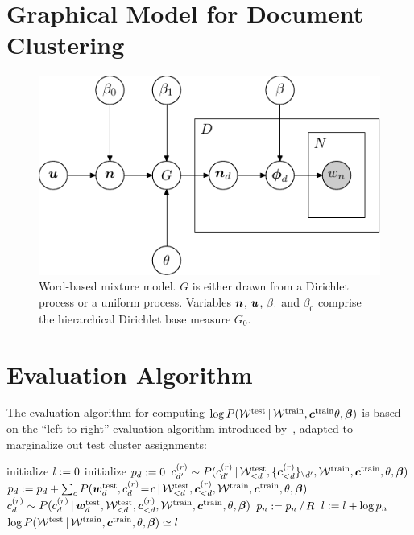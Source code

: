 \documentclass{article}
\begin{document}
\section{Graphical Model for Document Clustering}

\begin{figure}[ht!]
\begin{center}
\includegraphics[scale=0.75]{figures/dpmm_fixed-1.pdf}
\end{center}
\caption{Word-based mixture model. $G$ is either drawn from a
  Dirichlet process or a uniform process. Variables $\boldsymbol{n}$, $\boldsymbol{u}$, $\beta_1$
  and $\beta_0$ comprise the hierarchical Dirichlet base
  measure $G_0$.}
\label{fig:dpmm}
\end{figure}

\section{Evaluation Algorithm} \label{leftright}

The evaluation algorithm for computing
$\log{P(\mathcal{W}^{\textrm{test}} \,|\,\mathcal{W}^{\textrm{train}},
  \boldsymbol{c}^{\textrm{train}} \theta, \boldsymbol{\beta})}$ is based on the
``left-to-right'' evaluation algorithm introduced
by~\cite{wallach09evaluation}, adapted to marginalize out test cluster
assignments:

\begin{algorithm}[h]
\begin{algorithmic}
\State initialize $l := 0$  \State initialize $p_d := 0$
  \State $c^{(r)}_{d'}
\sim P(c^{(r)}_{d'} \,|\, \mathcal{W}^{\textrm{test}}_{<d}, \{
\boldsymbol{c}^{(r)}_{< d} \}_{\setminus {d'}}, \mathcal{W}^{\textrm{train}},
\boldsymbol{c}^{\textrm{train}},\theta, \boldsymbol{\beta})$ \EndFor \State $p_d := p_d +
\sum_c P(\boldsymbol{w}^{\textrm{test}}_d, c^{(r)}_d \!=\! c \,|\,
\mathcal{W}^{\textrm{test}}_{<d},\boldsymbol{c}^{(r)}_{<d},
\mathcal{W}^{\textrm{train}}, \boldsymbol{c}^{\textrm{train}},\theta, \boldsymbol{\beta})$
\State $c^{(r)}_d \sim P(c^{(r)}_d \,|\, \boldsymbol{w}^{\textrm{test}}_d,
\mathcal{W}^{\textrm{test}}_{<d},\boldsymbol{c}^{(r)}_{<d},\mathcal{W}^{\textrm{train}},
  \boldsymbol{c}^{\textrm{train}},\theta,\boldsymbol{\beta})$
\EndFor
\State $p_n := p_n \,/\, R$
\State $l := l + \log{p_n}$
\EndFor
\State $\log{P(\mathcal{W}^{\textrm{test}} \,|\,\mathcal{W}^{\textrm{train}},            
  \boldsymbol{c}^{\textrm{train}}, \theta,
  \boldsymbol{\beta})} \simeq l$
\end{algorithmic}
\end{algorithm}

\newpage




\end{document}
